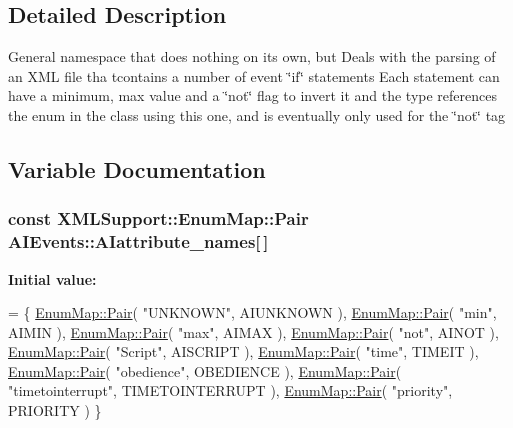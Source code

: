 \subsection{Detailed Description}
General namespace that does nothing on its own, but Deals with the parsing of an X\+ML file tha tcontains a number of event \char`\"{}if\char`\"{} statements Each statement can have a minimum, max value and a \char`\"{}not\char`\"{} flag to invert it and the type references the enum in the class using this one, and is eventually only used for the \char`\"{}not\char`\"{} tag 

\subsection{Variable Documentation}
\subsubsection[{\texorpdfstring{A\+Iattribute\+\_\+names}{AIattribute_names}}]{\setlength{\rightskip}{0pt plus 5cm}const {\bf X\+M\+L\+Support\+::\+Enum\+Map\+::\+Pair} A\+I\+Events\+::\+A\+Iattribute\+\_\+names\mbox{[}$\,$\mbox{]}}\hypertarget{namespaceAIEvents_a3e13e5faa015783773d98b7ce06353ab}{}\label{namespaceAIEvents_a3e13e5faa015783773d98b7ce06353ab}
{\bfseries Initial value\+:}
\begin{DoxyCode}
= \{
    \hyperlink{structXMLSupport_1_1EnumMap_1_1Pair}{EnumMap::Pair}( \textcolor{stringliteral}{"UNKNOWN"},         AIUNKNOWN ),
    \hyperlink{structXMLSupport_1_1EnumMap_1_1Pair}{EnumMap::Pair}( \textcolor{stringliteral}{"min"},             AIMIN ),
    \hyperlink{structXMLSupport_1_1EnumMap_1_1Pair}{EnumMap::Pair}( \textcolor{stringliteral}{"max"},             AIMAX ),
    \hyperlink{structXMLSupport_1_1EnumMap_1_1Pair}{EnumMap::Pair}( \textcolor{stringliteral}{"not"},             AINOT ),
    \hyperlink{structXMLSupport_1_1EnumMap_1_1Pair}{EnumMap::Pair}( \textcolor{stringliteral}{"Script"},          AISCRIPT ),
    \hyperlink{structXMLSupport_1_1EnumMap_1_1Pair}{EnumMap::Pair}( \textcolor{stringliteral}{"time"},            TIMEIT ),
    \hyperlink{structXMLSupport_1_1EnumMap_1_1Pair}{EnumMap::Pair}( \textcolor{stringliteral}{"obedience"},       OBEDIENCE ),
    \hyperlink{structXMLSupport_1_1EnumMap_1_1Pair}{EnumMap::Pair}( \textcolor{stringliteral}{"timetointerrupt"}, TIMETOINTERRUPT ),
    \hyperlink{structXMLSupport_1_1EnumMap_1_1Pair}{EnumMap::Pair}( \textcolor{stringliteral}{"priority"},        PRIORITY )
\}
\end{DoxyCode}
